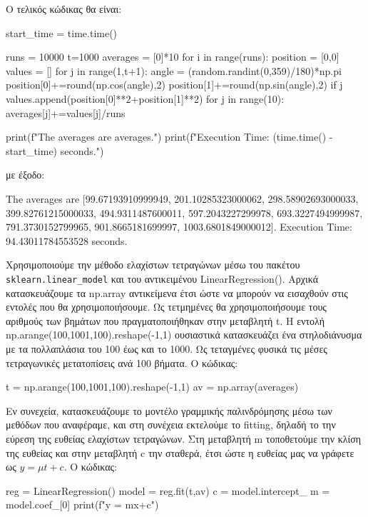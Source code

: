Ο τελικός κώδικας θα είναι: \en
\begin{python}
start_time = time.time()

runs = 10000
t=1000
averages = [0]*10
for i in range(runs):
    position = [0,0]
    values = []
    for j in range(1,t+1):
        angle = (random.randint(0,359)/180)*np.pi
        position[0]+=round(np.cos(angle),2)
        position[1]+=round(np.sin(angle),2)
        if j%
            values.append(position[0]**2+position[1]**2)
    for j in range(10):
        averages[j]+=values[j]/runs

print(f"The averages are {averages}.")
print(f"Execution Time: {(time.time() - start_time)} seconds.")
\end{python}
\gr 
με έξοδο:
\en
\begin{python}
The averages are [99.67193910999949, 
                  201.10285323000062, 
                  298.58902693000033, 
                  399.82761215000033, 
                  494.9311487600011, 
                  597.2043227299978, 
                  693.3227494999987, 
                  791.3730152799965, 
                  901.8665181699997, 
                  1003.6801849000012].
Execution Time: 94.43011784553528 seconds.
\end{python}
\gr 
Χρησιμοποιούμε την μέθοδο ελαχίστων τετραγώνων μέσω του πακέτου {\en \texttt{sklearn.linear\_model}} και του αντικειμένου {\en LinearRegression()}. Αρχικά κατασκευάζουμε τα {\en np.array} αντικείμενα έτσι ώστε να μπορούν να εισαχθούν στις εντολές που θα χρησιμοποιήσουμε. Ως τετμημένες θα χρησιμοποιήσουμε τους αριθμούς των βημάτων που πραγματοποιήθηκαν στην μεταβλητή {\en t}. Η εντολή {\en  np.arange(100,1001,100).reshape(-1,1)} ουσιαστικά κατασκευάζει ένα στηλοδιάνυσμα με τα πολλαπλάσια του 100 έως και το 1000.  Ως τεταγμένες φυσικά τις μέσες τετραγωνικές μετατοπίσεις ανά 100 βήματα. Ο κώδικας:
\en
\begin{python}
t = np.arange(100,1001,100).reshape(-1,1)
av = np.array(averages)
\end{python}
\gr 
Εν συνεχεία, κατασκευάζουμε το μοντέλο γραμμικής παλινδρόμησης μέσω των μεθόδων που αναφέραμε, και στη συνέχεια εκτελούμε το {\en fitting}, δηλαδή το την εύρεση της ευθείας ελαχίστων τετραγώνων. Στη μεταβλητή {\en m} τοποθετούμε την κλίση της ευθείας και στην μεταβλητή {\en c} την σταθερά, έτσι ώστε η ευθείας μας να γράφετε ως $y = \mu t+c$. Ο κώδικας:
\en
\begin{python}
reg = LinearRegression()
model = reg.fit(t,av)
c = model.intercept_
m = model.coef_[0]
print(f"y = {m}x+{c}")
\end{python}
